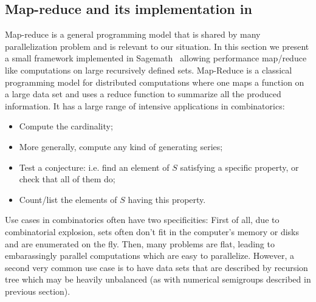 \documentclass{deliverablereport}
\begin{document}
\subsection{Map-reduce and its implementation in \Sage}
\label{subsec:map-reduce:Sage}

Map-reduce is a general programming model that is shared by many
parallelization problem and is relevant to our situation. In this section we
present a small framework implemented in Sagemath~\cite{sage} allowing
performance map/reduce like computations on
large recursively defined sets. Map-Reduce is a classical programming model
for distributed computations where one maps a function on a large data set and
uses a reduce function to summarize all the produced information. It has a
large range of intensive applications in combinatorics:
\begin{itemize}
  \item Compute the cardinality;
  \item More generally, compute any kind of generating series;
  \item Test a conjecture: i.e. find an element of $S$ satisfying a specific
    property, or check that all of them do;
  \item Count/list the elements of $S$ having this property.
\end{itemize}
Use cases in combinatorics often have two specificities: First of all, due to
combinatorial explosion, sets often don't fit in the computer's memory or
disks and are enumerated on the fly. Then, many problems are flat, leading to
embarassingly parallel computations which are easy to parallelize. However, a
second very common use case is to have data sets that are described by
recursion tree which may be heavily unbalanced (as with numerical semigroups
described in previous section).
\end{document}
